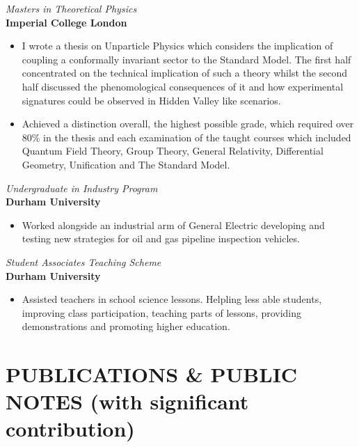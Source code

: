 \documentclass[margin, 10pt]{res} %
\begin{document}
\begin{resume}
{\sl Masters in Theoretical Physics}\\
{\bf Imperial College London}
\begin{itemize} \itemsep -2pt %
\item I wrote a thesis on Unparticle Physics which considers the implication of coupling a conformally invariant sector to the Standard Model. The first half concentrated on the technical implication of such a theory whilst the second half discussed the phenomological consequences of it and how experimental signatures could be observed in Hidden Valley like scenarios. 
\item Achieved a distinction overall, the highest possible grade, which required over 80\% in the thesis and each examination of the taught courses which included Quantum Field Theory, Group Theory, General Relativity, Differential Geometry, Unification and The Standard Model.  
\end{itemize}

{\sl Undergraduate in Industry Program}\\
{\bf Durham University}
\begin{itemize} \itemsep -2pt %
\item Worked alongside an industrial arm of General Electric developing and testing new strategies for oil and gas pipeline inspection vehicles.
\end{itemize}

{\sl Student Associates Teaching Scheme}\\
{\bf Durham University}
\begin{itemize} \itemsep -2pt %
\item Assisted teachers in school science lessons. Helpling less able students, improving class participation, teaching parts of lessons, providing demonstrations and promoting higher education. 
\end{itemize}


\section{PUBLICATIONS \& PUBLIC NOTES \newline(with significant contribution)}


\end{resume}
\end{document}
